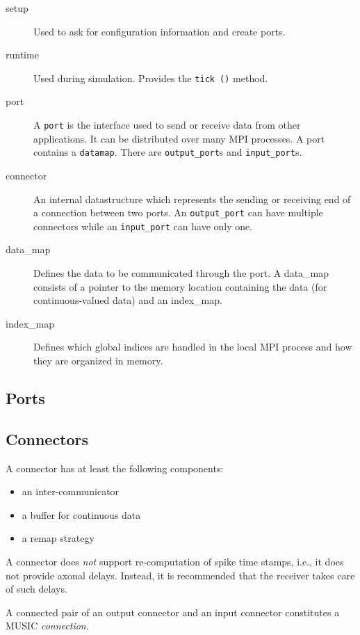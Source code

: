 \documentclass[a4paper]{report}
\begin{document}
\begin{description}
  \item[setup] Used to ask for configuration information and create
    ports.
  \item[runtime] Used during simulation.  Provides the \verb|tick ()|
    method.
  \item[port] A \verb|port| is the interface used to send or receive
    data from other applications.  It can be distributed over many MPI
    processes.  A port contains a \verb|datamap|.  There are
    \verb|output_port|s and \verb|input_port|s.
  \item[connector] An internal datastructure which represents the
    sending or receiving end of a connection between two ports.  An
    \verb|output_port| can have multiple connectors while an
    \verb|input_port| can have only one.
  \item[data\_map] Defines the data to be communicated through the
    port.  A data\_map consists of a pointer to the memory location
    containing the data (for continuous-valued data) and an
    index\_map.
  \item[index\_map] Defines which global indices are handled in the
    local MPI process and how they are organized in memory.
\end{description}

\subsection{Ports}

\subsection{Connectors}

A connector has at least the following components:
\begin{itemize}
  \item an inter-communicator
  \item a buffer for continuous data
  \item a remap strategy
\end{itemize}

A connector does \emph{not} support re-computation of spike time
stamps, i.e., it does not provide axonal delays.  Instead, it is
recommended that the receiver takes care of such delays.

A connected pair of an output connector and an input connector
constitutes a MUSIC \emph{connection}.
\end{document}
